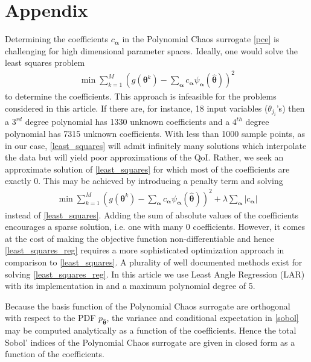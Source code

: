 \section*{Appendix}

Determining the coefficients $c_{\boldsymbol{\alpha}}$ in the Polynomial Chaos surrogate \eqref{pce} is challenging for high dimensional parameter spaces. Ideally, one would solve the least squares problem
\begin{eqnarray}
\label{least_squares}
\min \sum\limits_{k=1}^M \left(g(\boldsymbol{\theta}^k)-\sum_{\boldsymbol{\alpha}} c_{\boldsymbol{\alpha}} \psi_{\boldsymbol{\alpha}}(\hat{\boldsymbol{\theta}}) \right)^2
\end{eqnarray}
to determine the coefficients. This approach is infeasible for the problems considered in this article. If there are, for instance, 18 input variables ($\theta_{j_i}$'s) then a $3^{rd}$ degree polynomial has 1330 unknown coefficients and a $4^{th}$ degree polynomial has 7315 unknown coefficients. With less than 1000 sample points, as in our case, \eqref{least_squares} will admit infinitely many solutions which interpolate the data but will yield poor approximations of the QoI. Rather, we seek an approximate solution of \eqref{least_squares} for which most of the coefficients are exactly 0. This may be achieved by introducing a penalty term and solving
\begin{eqnarray}
\label{least_squares_reg}
\min \sum\limits_{k=1}^M \left(g(\boldsymbol{\theta}^k)-\sum_{\boldsymbol{\alpha}} c_{\boldsymbol{\alpha}} \psi_{\boldsymbol{\alpha}}(\hat{\boldsymbol{\theta}}) \right)^2 + \lambda \sum_{\boldsymbol{\alpha}} \vert c_{\boldsymbol{\alpha}} \vert
\end{eqnarray}
instead of \eqref{least_squares}. Adding the sum of absolute values of the coefficients encourages a sparse solution, i.e. one with many 0 coefficients. However, it comes at the cost of making the objective function non-differentiable and hence \eqref{least_squares_reg} requires a more sophisticated optimization approach in comparison to \eqref{least_squares}. A plurality of well documented methods exist for solving \eqref{least_squares_reg}. In this article we use Least Angle Regression (LAR) \cite{lar} with its implementation in \cite{uqlab} and a maximum polynomial degree of 5.

Because the basis function of the Polynomial Chaos surrogate are orthogonal with respect to the PDF $p_{\hat{\boldsymbol{\theta}}}$, the variance and conditional expectation in \eqref{sobol} may be computed analytically as a function of the coefficients. Hence the total Sobol' indices of the Polynomial Chaos surrogate are given in closed form as a function of the coefficients.